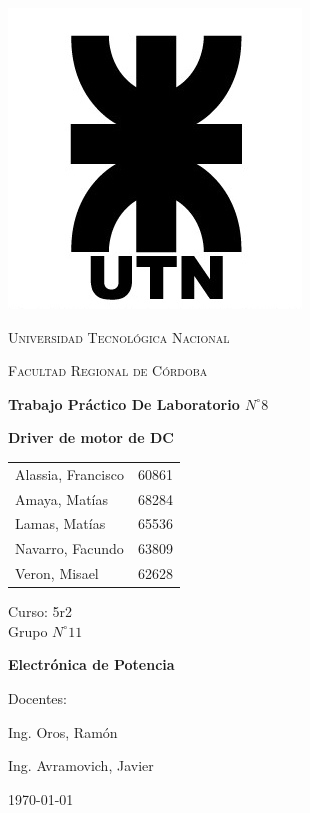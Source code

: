 \documentclass[11pt, a4paper]{article}
\begin{document}
\begin{titlepage}
 \centering
	\includegraphics[scale=0.80]{imagenes/LOGO.jpg} \par
 	\vspace{1cm}
 	{\scshape\LARGE Universidad Tecnológica Nacional \par}
 	{\scshape\large Facultad Regional de Córdoba \par}
 	\vspace{1cm}
	{\bfseries \Large Trabajo Práctico De Laboratorio $N^{\circ} 8$\par}
	{\bfseries \Large Driver de motor de DC\par}
 	\vspace{1.5cm}

	\begin{tabular}{ll}
		Alassia, Francisco		&	60861	\\
		Amaya, Matías			&	68284	\\
		Lamas, Matías			&	65536 	\\
		Navarro, Facundo		&	63809 	\\
		Veron, Misael			&	62628
	\end{tabular}
	
	\vspace{1cm}
	Curso: 5r2 \\
	Grupo $N^{\circ} 11$
 	\vfill
	{\bfseries \Large Electrónica de Potencia \par}

	\vspace{1.5cm}
	Docentes: \par
	Ing. Oros, Ramón \par
	Ing. Avramovich, Javier \par

 	\vfill
	{\large \today\par}
\end{titlepage}
\end{document}
